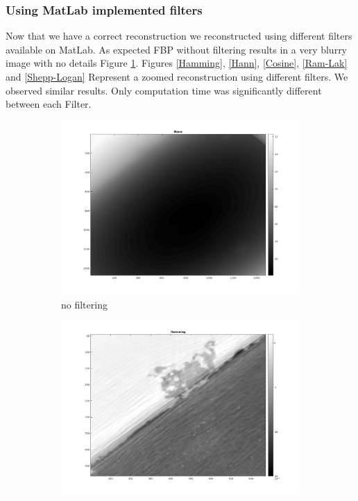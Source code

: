 \documentclass[10pt,a4paper,titlepage]{article}
\begin{document}
	\clearpage
	
	
		\subsubsection{Using MatLab implemented filters}
			
			Now that we have a correct reconstruction we reconstructed using different filters available on MatLab. As expected FBP without filtering results in a very blurry image with no details Figure \ref{NoFilter}. Figures \ref{Hamming}, \ref{Hann}, \ref{Cosine}, \ref{Ram-Lak} and \ref{Shepp-Logan} Represent a zoomed reconstruction using different filters. We observed similar results. Only computation time was significantly different between each Filter.
			
		\begin{figure}[h!]
        \centering	
			\begin{subfigure}[b]{0.475\textwidth}
            \centering
            \includegraphics[width=\textwidth]{filters/none.png}  
            \caption{no filtering} 
            \label{NoFilter}
        \end{subfigure}
        \hfill
        \begin{subfigure}[b]{0.475\textwidth}  
            \centering 
            \includegraphics[width=\textwidth]{filters/ZOOMED/Hamming.png}   

\end{subfigure}
\end{figure}
\end{document}

